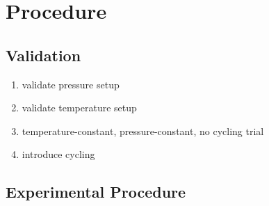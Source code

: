 \chapter{Procedure}
\section{Validation}
\begin{enumerate}
    \item validate pressure setup
    \item validate temperature setup
    \item temperature-constant, pressure-constant, no cycling trial
    \item introduce cycling
\end{enumerate}

\section{Experimental Procedure}
